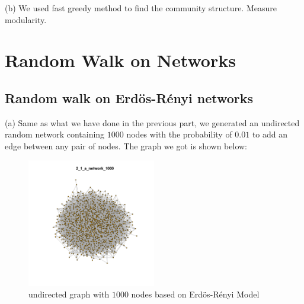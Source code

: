 \documentclass[draftcls,12pt,onecolumn]{IEEEtran}
\begin{document}
(b) We used fast greedy method to find the community structure. Measure modularity.









\section{Random Walk on Networks}
\subsection{Random walk on Erd\"os-R\'enyi networks}
(a) Same as what we have done in the previous part, we generated an undirected random network containing $1000$ nodes with the probability of $0.01$ to add an edge between any pair of nodes. The graph we got is shown below:
\begin{figure}[H]
\centering
\includegraphics[width=0.5\textwidth]{2_1_a_network_1000.png}
\caption{undirected graph with $1000$ nodes based on Erd\"os-R\'enyi Model}
\end{figure}
\end{document}
